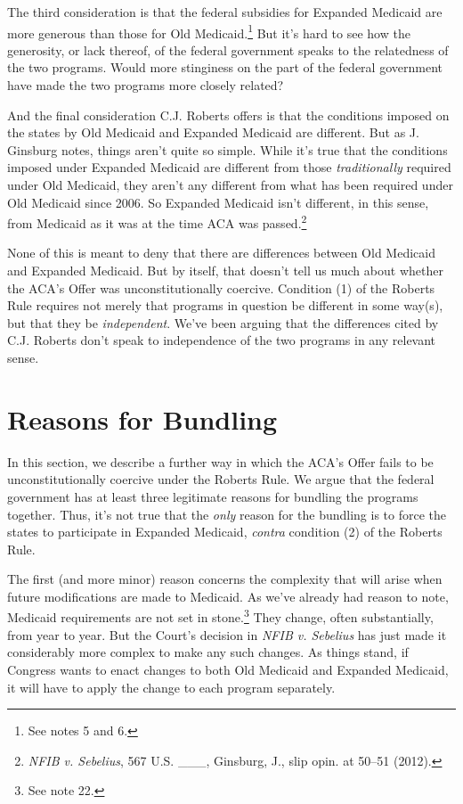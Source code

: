 \documentclass[
  10pt,
  letterpaper,
  DIV=11,
  numbers=noendperiod,
  twoside]{scrartcl}
\begin{document}
The third consideration is that the federal subsidies for Expanded
Medicaid are more generous than those for Old Medicaid.\footnote{See
  notes 5 and 6.} But it's hard to see how the generosity, or lack
thereof, of the federal government speaks to the relatedness of the two
programs. Would more stinginess on the part of the federal government
have made the two programs more closely related?

And the final consideration C.J. Roberts offers is that the conditions
imposed on the states by Old Medicaid and Expanded Medicaid are
different. But as J. Ginsburg notes, things aren't quite so simple.
While it's true that the conditions imposed under Expanded Medicaid are
different from those \emph{traditionally} required under Old Medicaid,
they aren't any different from what has been required under Old Medicaid
since 2006. So Expanded Medicaid isn't different, in this sense, from
Medicaid as it was at the time ACA was passed.\footnote{\emph{NFIB v.
  Sebelius}, 567 U.S. \_\_\_, Ginsburg, J., slip opin. at 50--51 (2012).}

None of this is meant to deny that there are differences between Old
Medicaid and Expanded Medicaid. But by itself, that doesn't tell us much
about whether the ACA's Offer was unconstitutionally coercive. Condition
(1) of the Roberts Rule requires not merely that programs in question be
different in some way(s), but that they be \emph{independent}. We've
been arguing that the differences cited by C.J. Roberts don't speak to
independence of the two programs in any relevant sense.

\section{Reasons for Bundling}\label{reasons-for-bundling}

In this section, we describe a further way in which the ACA's Offer
fails to be unconstitutionally coercive under the Roberts Rule. We argue
that the federal government has at least three legitimate reasons for
bundling the programs together. Thus, it's not true that the \emph{only}
reason for the bundling is to force the states to participate in
Expanded Medicaid, \emph{contra} condition (2) of the Roberts Rule.

The first (and more minor) reason concerns the complexity that will
arise when future modifications are made to Medicaid. As we've already
had reason to note, Medicaid requirements are not set in
stone.\footnote{See note 22.} They change, often substantially, from
year to year. But the Court's decision in \emph{NFIB v. Sebelius} has
just made it considerably more complex to make any such changes. As
things stand, if Congress wants to enact changes to both Old Medicaid
and Expanded Medicaid, it will have to apply the change to each program
separately.
\end{document}
